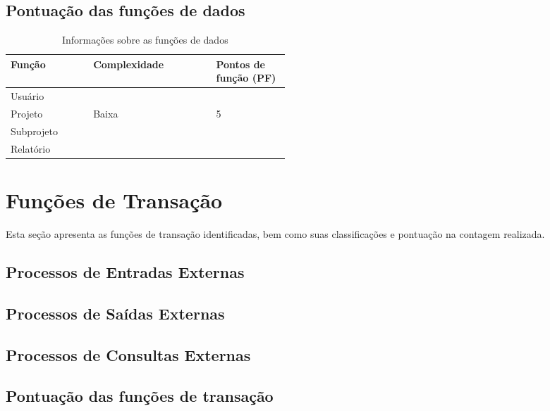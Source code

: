   \subsection{Pontuação das funções de dados}
  
      \begin{table*}[!h]
      \centering
      \caption{Informações sobre as funções de dados}
      \label{funcoes_dados}
	\begin{tabular}{|p{0.12\linewidth}|p{0.20\linewidth}|p{0.14\linewidth}|}
	\hline
	\textbf{Função} & \textbf{Complexidade} & \textbf{Pontos de função (PF)} \\
	  \hline
	Usuário &   & \\
	\hline
	Projeto & Baixa & 5 \\
	\hline
	Subprojeto &  & \\
	\hline
	Relatório & & \\
	\hline
	\end{tabular}
      \end{table*}

\section{Funções de Transação}
  
 Esta seção apresenta as funções de transação identificadas, bem como suas classificações e pontuação na contagem realizada.
  
  \subsection{Processos de Entradas Externas}
  
    
  
  \subsection{Processos de Saídas Externas}
    
    

  \subsection{Processos de Consultas Externas}
    
    
    
    
\vfill
\pagebreak
  \subsection{Pontuação das funções de transação}
    
